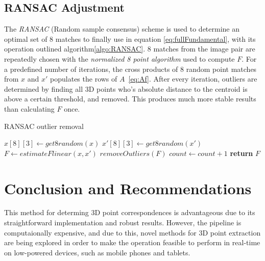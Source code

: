 \documentclass[12pt]{article}
\begin{document}
\subsection{RANSAC Adjustment}
The \textit{RANSAC} (Random sample consensus) scheme is used to determine an optimal set of 8 matches to finally use in equation \ref{eq:fullFundamental}, with its operation outlined algorithm\ref{algo:RANSAC}. 8 matches from the image pair are repeatedly chosen with the \textit{normalized 8 point algorithm} used to compute $F$. For a predefined number of iterations, the cross products of 8 random point matches from $x$ and $x'$ populates the rows of $A$~\eqref{eq:Af}. After every iteration, outliers are determined by finding all 3D points who's absolute distance to the centroid is above a certain threshold, and removed. This produces much more stable results than calculating $F$ once.

\begin{algorithm*}
    \caption{RANSAC outlier removal}
    \begin{algorithmic}[1]
            \State $x[8][3]\gets get8random(x)$
            \State $x'[8][3]\gets get8random(x')$
            \State $F\gets estimateFlinear(x, x')$
            \State $removeOutliers(F)$
            \State $count\gets count+1$
        \EndWhile\label{RANSACOutliers}
        \State \textbf{return} $F$
        \EndProcedure
    \end{algorithmic}
\label{algo:RANSAC}
\end{algorithm*}

\section{Conclusion and Recommendations}
This method for determing 3D point correspondences is advantageous due to its straightforward implementation and robust results. However, the pipeline is computaionally expensive, and due to this, novel methods for 3D point extraction are being explored in order to make the operation feasible to perform in real-time on low-powered devices, such as mobile phones and tablets.

{}

\end{document}
